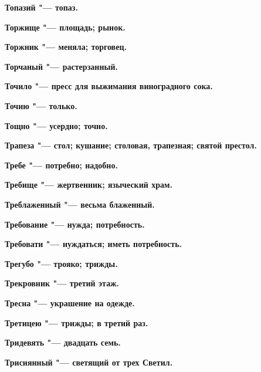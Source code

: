 \bfseries Топазий \normalfont{} "--- топаз. 




\bfseries Торжище \normalfont{} "--- площадь; рынок. 




\bfseries Торжник \normalfont{} "--- меняла; торговец. 




\bfseries Торчаный \normalfont{} "--- растерзанный. 




\bfseries Точило \normalfont{} "--- пресс для выжимания виноградного сока. 




\bfseries Точию \normalfont{} "--- только. 




\bfseries Тощно \normalfont{} "--- усердно; точно. 




\bfseries Трапеза \normalfont{} "--- стол; кушание; столовая, трапезная; святой престол. 




\bfseries Требе \normalfont{} "--- потребно; надобно. 




\bfseries Требище \normalfont{} "--- жертвенник; языческий храм. 




\bfseries Треблаженный \normalfont{} "--- весьма блаженный. 




\bfseries Требование \normalfont{} "--- нужда; потребность. 




\bfseries Требовати \normalfont{} "--- нуждаться; иметь потребность. 




\bfseries Трегубо \normalfont{} "--- трояко; трижды. 




\bfseries Трекровник \normalfont{} "--- третий этаж. 




\bfseries Тресна \normalfont{} "--- украшение на одежде. 




\bfseries Третицею \normalfont{} "--- трижды; в третий раз. 




\bfseries Тридевять \normalfont{} "--- двадцать семь. 




\bfseries Трисиянный \normalfont{} "--- светящий от трех Светил. 




